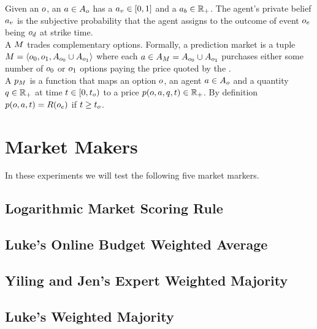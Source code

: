 Given an  $o$,
an  $a\in A_o$ has a  
$a_v \in [0,1]$ 
and a  $a_b \in \mathbb{R}_+$.
The agent's private belief $a_v$ 
is the subjective probability that the agent
assigns to the outcome of event $o_e$ being $o_d$
at strike time.\\

A  $M$ trades complementary options. 
Formally, a prediction market is a tuple $M = \left<o_0,o_1, 
A_{o_0} \cup A_{o_1} \right>$ where each  
$a\in A_M = A_{o_0} \cup A_{o_1}$ purchases 
either some number of $o_0$ or $o_1$ options paying the price quoted by the 
.\\


A  $p_M$ is a function 
that maps an option $o$, an agent $a \in A_o$ 
and a quantity $q\in\mathbb{R}_+$ at time $t \in [0,t_o)$ 
to a price $p(o,a,q, t) \in \mathbb{R}_+$. 
By definition $p(o,a, t) = R(o_e)$ if 
$t \ge t_o$.



\section{Market Makers}
In these experiments we will test the following five market markers.
\subsection{Logarithmic Market Scoring Rule}
\subsection{Luke's Online Budget Weighted Average}
\subsection{Yiling and Jen's Expert Weighted Majority}
\subsection{Luke's Weighted Majority}
